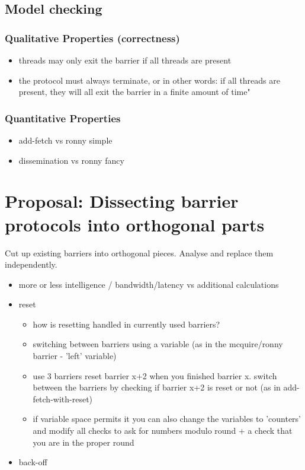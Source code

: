 \documentclass[a4paper, 10pt]{article}
\begin{document}
\subsection{Model checking}
\subsubsection{Qualitative Properties (correctness)}
\begin{itemize}
	\item threads may only exit the barrier if all threads are present
	\item the protocol must always terminate, or in other words: if all threads are present, they will all exit the barrier in a finite amount of time"
\end{itemize}
\subsubsection{Quantitative Properties}
\begin{itemize}
	\item add-fetch vs ronny simple
	\item dissemination vs ronny fancy
\end{itemize}

\section{Proposal: Dissecting barrier protocols into orthogonal parts}
Cut up existing barriers into orthogonal pieces. Analyse and replace them independently.
\begin{itemize}
	\item more or less intelligence / bandwidth/latency vs additional calculations
	\item 
		reset

		\begin{itemize}
			\item how is resetting handled in currently used barriers?
			\item switching between barriers using a variable (as in the mcquire/ronny barrier - 'left' variable)
			\item use 3 barriers reset barrier x+2 when you finished barrier x. switch between the barriers by checking if barrier x+2 is reset or not (as in add-fetch-with-reset)
			\item if variable space permits it you can also change the variables to 'counters' and modify all checks to ask for numbers modulo round + a check that you are in the proper round
		\end{itemize}

	\item back-off
\end{itemize}
\end{document}
